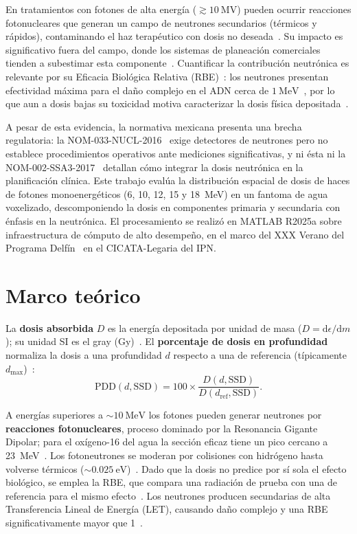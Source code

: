\documentclass[11pt,a4paper]{article}
\begin{document}
En tratamientos con fotones de alta energía (\(\gtrsim 10~\mathrm{MV}\)) pueden
ocurrir reacciones fotonucleares que generan un campo de neutrones secundarios
(térmicos y rápidos), contaminando el haz terapéutico con dosis no
deseada~\cite{banaee2021}. Su impacto es significativo fuera del campo, donde los
sistemas de planeación comerciales tienden a subestimar esta
componente~\cite{kry2017tg158}. Cuantificar la contribución neutrónica es relevante
por su Eficacia Biológica Relativa (RBE)~\cite{johns1983physics}: los neutrones
presentan efectividad máxima para el daño complejo en el ADN cerca de
\(1~\mathrm{MeV}\)~\cite{baiocco2016origin}, por lo que aun a dosis bajas su
toxicidad motiva caracterizar la dosis física depositada~\cite{kry2017tg158}.

A pesar de esta evidencia, la normativa mexicana presenta una brecha regulatoria: la
NOM-033-NUCL-2016~\cite{nom033_2016} exige detectores de neutrones pero no establece
procedimientos operativos ante mediciones significativas, y ni ésta ni la
NOM-002-SSA3-2017~\cite{nom002ssa32017} detallan cómo integrar la dosis neutrónica en
la planificación clínica. Este trabajo evalúa la distribución espacial de dosis de
haces de fotones monoenergéticos (6, 10, 12, 15 y 18~MeV) en un fantoma de agua
voxelizado, descomponiendo la dosis en componentes primaria y secundaria con énfasis
en la neutrónica. El procesamiento se realizó en MATLAB R2025a sobre infraestructura
de cómputo de alto desempeño, en el marco del XXX Verano del Programa
Delfín~\cite{programadelfin2025} en el CICATA-Legaria del IPN.

\section{Marco teórico}
La \textbf{dosis absorbida} \(D\) es la energía depositada por unidad de masa
(\(D=\mathrm{d}\epsilon/\mathrm{d}m\)); su unidad SI es el gray
(Gy)~\cite{attix2004dosimetry}. El \textbf{porcentaje de dosis en profundidad}
normaliza la dosis a una profundidad \(d\) respecto a una de referencia (típicamente
\(d_{\max}\))~\cite{khan2014radiation}:
\begin{equation}
  \mathrm{PDD}(d,\mathrm{SSD}) = 100 \times
  \frac{D(d,\mathrm{SSD})}{D(d_{\mathrm{ref}},\mathrm{SSD})}.
\end{equation}

A energías superiores a \(\sim 10~\mathrm{MeV}\) los fotones pueden generar neutrones
por \textbf{reacciones fotonucleares}, proceso dominado por la Resonancia Gigante
Dipolar; para el oxígeno-16 del agua la sección eficaz tiene un pico cercano a
23~MeV~\cite{geant4physref}. Los fotoneutrones se moderan por colisiones con
hidrógeno hasta volverse térmicos (\(\sim 0.025~\mathrm{eV}\))~\cite{lakshmanan1982}.
Dado que la dosis no predice por sí sola el efecto biológico, se emplea la RBE, que
compara una radiación de prueba con una de referencia para el mismo
efecto~\cite{reeve2018}. Los neutrones producen secundarias de alta Transferencia
Lineal de Energía (LET), causando daño complejo y una RBE significativamente mayor
que 1~\cite{reeve2018}.
\end{document}
